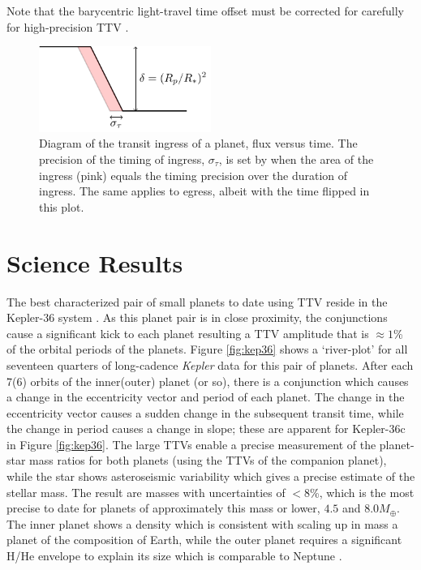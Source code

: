 \documentclass[graybox,natbib,nosecnum]{svmult}
\begin{document}
Note that the barycentric light-travel time offset must be corrected for carefully for high-precision
TTV \citep{2010PASP..122..935E}.

\begin{figure}
\centerline{
\includegraphics[width=0.5\textwidth]{ingress.pdf}}
%
\caption{Diagram of the transit ingress of a planet, flux versus time.  The precision of the timing of ingress, $\sigma_\tau$, is set by
when the area of the ingress (pink) equals the timing precision over the duration of ingress. The same applies to egress, albeit
with the time flipped in this plot.}
\label{fig:ingress}       %
\end{figure}

\section{Science Results}

The best characterized pair of small planets to date using TTV reside in the Kepler-36 system \citep{2012Sci...337..556C}.  As this planet pair is in close proximity, the conjunctions cause a significant kick to each planet resulting a TTV amplitude that is $\approx 1$\% of the orbital periods of the planets.  Figure \ref{fig:kep36} shows a `river-plot' for all seventeen quarters of long-cadence \emph{Kepler} data for this pair of planets.  After each 7(6) orbits of the inner(outer) planet (or so), there is a conjunction which causes a change in the eccentricity vector and period of each planet.  The change in the eccentricity vector causes a sudden change in the subsequent transit time, while the change in period causes a change in slope;  these are apparent for Kepler-36c in Figure \ref{fig:kep36}.  The large TTVs enable a precise measurement of the planet-star mass ratios for both planets (using the TTVs of the companion planet), while the star shows asteroseismic variability which gives a precise estimate of the stellar mass.   The result are masses with uncertainties of $<8$\%, which is the most precise to date for planets of approximately this mass or lower, $4.5$ and $8.0 M_\oplus$.  The inner planet shows a density which is consistent with scaling up in mass a planet of the composition of Earth, while the outer planet requires a significant H/He envelope to explain its size which is comparable to Neptune \citep{2012Sci...337..556C}.
\end{document}

